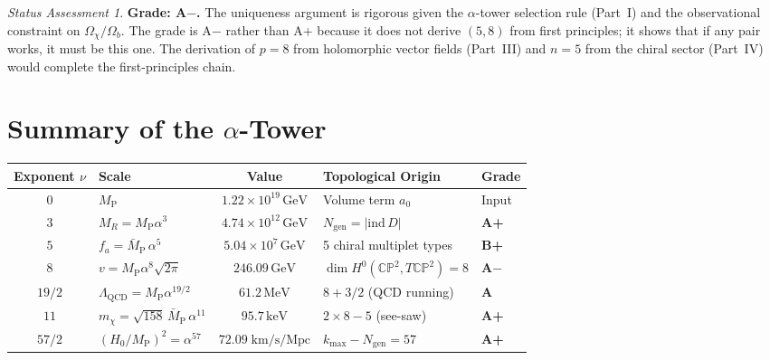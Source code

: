 \documentclass[11pt]{article}
\theoremstyle{definition}
\theoremstyle{remark}
\newtheorem*{status}{Status Assessment}
\newcommand{\CP}{\mathbb{CP}}
\newcommand{\MP}{M_{\mathrm{P}}}
\newcommand{\MPbar}{\bar{M}_{\mathrm{P}}}
\newcommand{\keV}{\,\mathrm{keV}}
\newcommand{\GeV}{\,\mathrm{GeV}}
\newcommand{\MeV}{\,\mathrm{MeV}}
\begin{document}
\begin{status}
\textbf{Grade: A$-$.}  The uniqueness argument is rigorous given the
$\alpha$-tower selection rule (Part~I) and the observational constraint
on $\Omega_\chi/\Omega_b$.  The grade is A$-$ rather than A+ because
it does not derive $(5, 8)$ from first principles; it shows that
if any pair works, it must be this one.  The derivation of $p = 8$
from holomorphic vector fields (Part~III) and $n = 5$ from the chiral
sector (Part~IV) would complete the first-principles chain.
\end{status}


\section{Summary of the $\alpha$-Tower}
\label{sec:summary}

\begin{center}
\renewcommand{\arraystretch}{1.5}
\begin{tabular}{clcll}
\toprule
\textbf{Exponent $\nu$} & \textbf{Scale} & \textbf{Value}
  & \textbf{Topological Origin} & \textbf{Grade} \\
\midrule
$0$ & $\MP$ & $1.22 \times 10^{19}\GeV$ & Volume term $a_0$
  & Input \\
$3$ & $M_R = \MP\alpha^3$ & $4.74 \times 10^{12}\GeV$
  & $N_{\mathrm{gen}} = |\mathrm{ind}\,D|$
  & \textbf{A+} \\
$5$ & $f_a = \MPbar\,\alpha^5$ & $5.04 \times 10^{7}\GeV$
  & 5 chiral multiplet types
  & \textbf{B+} \\
$8$ & $v = \MP\alpha^8\sqrt{2\pi}$ & $246.09\GeV$
  & $\dim H^0(\CP^2, T\CP^2) = 8$
  & \textbf{A$-$} \\
$19/2$ & $\Lambda_{\mathrm{QCD}} = \MP\alpha^{19/2}$ & $61.2\MeV$
  & $8 + 3/2$ (QCD running)
  & \textbf{A} \\
$11$ & $m_\chi = \sqrt{158}\,\MPbar\,\alpha^{11}$ & $95.7\keV$
  & $2 \times 8 - 5$ (see-saw)
  & \textbf{A+} \\
$57/2$ & $(H_0/\MP)^2 = \alpha^{57}$ & $72.09\;\mathrm{km/s/Mpc}$
  & $k_{\max} - N_{\mathrm{gen}} = 57$
  & \textbf{A+} \\
\bottomrule
\end{tabular}
\end{center}


\end{document}
